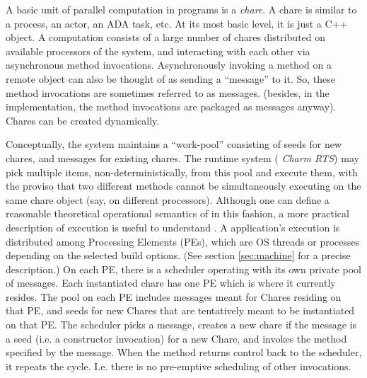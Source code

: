 A basic
unit of parallel computation in \charm programs is a {\em
chare}. 
A chare is similar to a process, an actor, an ADA task,
etc. At its most basic level, it is just a C++ object.
A \charm computation consists of a large number of chares
distributed on available processors of the system, and interacting
with each other via asynchronous method invocations.
Asynchronously invoking a method on a remote object can also be
thought of as
sending a ``message'' to it. So, these method invocations are
sometimes referred to as messages. (besides, in the implementation,
the method invocations are packaged as messages anyway).
Chares can be
created dynamically.

Conceptually, the system maintains a
``work-pool'' consisting of seeds for new chares, and
messages for existing chares. The \charm runtime system ({\em
Charm RTS}) may pick multiple items, non-deterministically, from this
pool and execute them, with the proviso that two different methods
cannot be simultaneously executing on the same chare object (say, on
different processors). Although one can define a reasonable
theoretical operational semantics of \charm in this fashion, a more
practical description of execution is useful to understand \charm.
A \charmpp{} application's execution is distributed among Processing Elements
(PEs), which are OS threads or processes depending on the selected \charmpp{}
build options. (See section \ref{sec:machine} for a precise description.)
On each PE, there is a scheduler operating with its own private pool
of messages. Each instantiated chare has one PE which is where it
currently resides. The pool on each PE includes messages meant for
Chares residing on that PE, and seeds for new Chares that are
tentatively meant to be instantiated on that PE. The scheduler picks a
message, creates a new chare if the message is a seed (i.e. a
constructor invocation) for a new Chare, and invokes the method
specified by the message. When the method returns control back to the
scheduler, it repeats the cycle. I.e. there is no pre-emptive
scheduling of other invocations.

